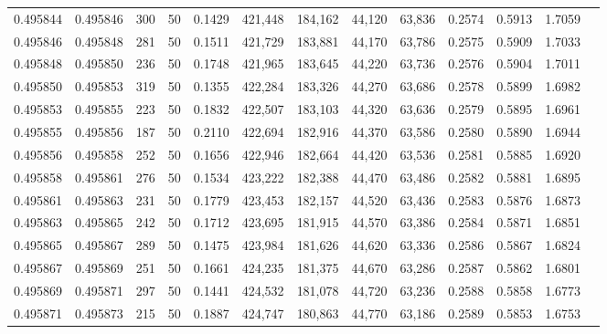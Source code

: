 \begin{tabular}{rrrrrrrrrrrrr}
0.495844 & 0.495846 &   300 &  50 &                                     0.1429 & 421,448 & 184,162 &  44,120 &  63,836 & 0.2574 & 0.5913 & 1.7059 \\
0.495846 & 0.495848 &   281 &  50 &                                     0.1511 & 421,729 & 183,881 &  44,170 &  63,786 & 0.2575 & 0.5909 & 1.7033 \\
0.495848 & 0.495850 &   236 &  50 &                                     0.1748 & 421,965 & 183,645 &  44,220 &  63,736 & 0.2576 & 0.5904 & 1.7011 \\
0.495850 & 0.495853 &   319 &  50 &                                     0.1355 & 422,284 & 183,326 &  44,270 &  63,686 & 0.2578 & 0.5899 & 1.6982 \\
0.495853 & 0.495855 &   223 &  50 &                                     0.1832 & 422,507 & 183,103 &  44,320 &  63,636 & 0.2579 & 0.5895 & 1.6961 \\
0.495855 & 0.495856 &   187 &  50 &                                     0.2110 & 422,694 & 182,916 &  44,370 &  63,586 & 0.2580 & 0.5890 & 1.6944 \\
0.495856 & 0.495858 &   252 &  50 &                                     0.1656 & 422,946 & 182,664 &  44,420 &  63,536 & 0.2581 & 0.5885 & 1.6920 \\
0.495858 & 0.495861 &   276 &  50 &                                     0.1534 & 423,222 & 182,388 &  44,470 &  63,486 & 0.2582 & 0.5881 & 1.6895 \\
0.495861 & 0.495863 &   231 &  50 &                                     0.1779 & 423,453 & 182,157 &  44,520 &  63,436 & 0.2583 & 0.5876 & 1.6873 \\
0.495863 & 0.495865 &   242 &  50 &                                     0.1712 & 423,695 & 181,915 &  44,570 &  63,386 & 0.2584 & 0.5871 & 1.6851 \\
0.495865 & 0.495867 &   289 &  50 &                                     0.1475 & 423,984 & 181,626 &  44,620 &  63,336 & 0.2586 & 0.5867 & 1.6824 \\
0.495867 & 0.495869 &   251 &  50 &                                     0.1661 & 424,235 & 181,375 &  44,670 &  63,286 & 0.2587 & 0.5862 & 1.6801 \\
0.495869 & 0.495871 &   297 &  50 &                                     0.1441 & 424,532 & 181,078 &  44,720 &  63,236 & 0.2588 & 0.5858 & 1.6773 \\
0.495871 & 0.495873 &   215 &  50 &                                     0.1887 & 424,747 & 180,863 &  44,770 &  63,186 & 0.2589 & 0.5853 & 1.6753 \\

\end{tabular}
